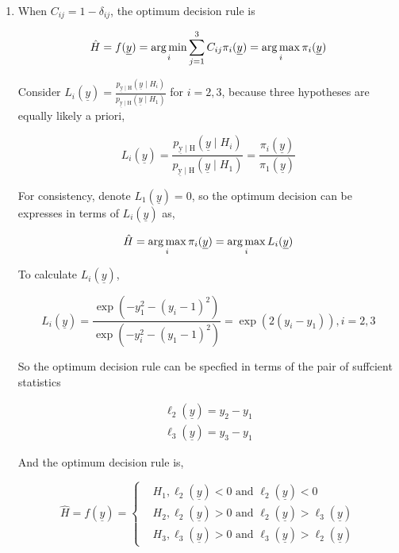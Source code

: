 \documentclass[a4paper]{article}
\begin{document}
\begin{enumerate}
\begin{enumerate}
  \item When $C_{ij} = 1- \delta_{ij}$, the optimum decision rule is 
  
  \begin{equation}
    \hat H = f(\underline{y}) = \operatorname*{arg\,min}_{i} \sum_{j=1}^3 C_{ij}\pi_i(\underline{y}) = \operatorname*{arg\,max}_{i} \pi_i(\underline{y})
  \end{equation}

  Consider $L_{i}(\underline{y})=\frac{p_{\underline{\mathrm{y}} \mid \mathrm{H}}\left(\underline{y} \mid H_{i}\right)}{p_{\underline{\mathrm{y}} \mid \mathrm{H}}\left(\underline{y} \mid H_{1}\right)}$ for $i =2,3$, because three hypotheses are equally likely a priori, 

  \begin{equation}
    L_{i}(\underline{y})=\frac{p_{\underline{\mathrm{y}} \mid \mathrm{H}}\left(\underline{y} \mid H_{i}\right)}{p_{\underline{\mathrm{y}} \mid \mathrm{H}}\left(\underline{y} \mid H_{1}\right)} = \frac {\pi_i(\underline{y})} { \pi_1(\underline{y})}
  \end{equation}

  For consistency, denote $L_{1}(\underline{y})= 0$, so the optimum decision can be expresses in terms of $ L_{i}(\underline{y})$ as,

  \begin{equation}
    \hat H = \operatorname*{arg\,max}_{i} \pi_i(\underline{y}) = \operatorname*{arg\,max}_{i} L_i(\underline{y})
  \end{equation}

  To calculate $L_i(\underline{y})$,

  \begin{equation}
    L_i(\underline{y}) = \frac {\exp \left(-y_1^2 -(y_i-1)^2\right)}{\exp \left(-y_i^2 -(y_1-1)^2\right)} = \exp\left(2(y_i-y_1)\right),i=2,3
  \end{equation}

  So the optimum decision rule can be specfied in terms of the pair of suffcient statistics

  \begin{equation}
    \begin{array}{l}\ell_{2}(\underline{y})=y_{2}-y_{1} \\ \ell_{3}(\underline{y})=y_{3}-y_{1}\end{array}
  \end{equation}

  And the optimum decision rule is,

  \begin{equation}
    \hat H = f(\underline{y}) = \left\{
      \begin{aligned}
        &H_1,\ell_{2}(\underline{y})<0 \text{ and } \ell_{2}(\underline{y})<0 \\
        &H_2, \ell_{2}(\underline{y})>0 \text{ and } \ell_{2}(\underline{y})> \ell_{3}(\underline{y}) \\
        &H_3, \ell_{3}(\underline{y}) > 0 \text{ and }  \ell_{3}(\underline{y}) > \ell_{2}(\underline{y})
      \end{aligned}
      \right.
  \end{equation}
\end{enumerate}


\end{enumerate}
\end{document}
